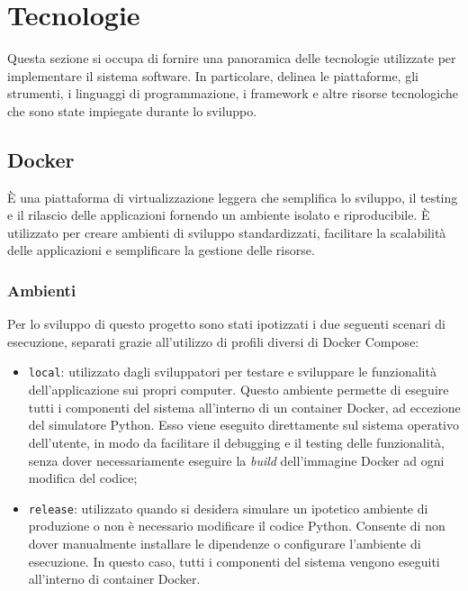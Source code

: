 \section{Tecnologie}
Questa sezione si occupa di fornire una panoramica delle tecnologie utilizzate per implementare il sistema software.
In particolare, delinea le piattaforme, gli strumenti, i linguaggi di programmazione, i framework e altre risorse tecnologiche che sono state impiegate durante lo sviluppo.

\subsection{Docker}
È una piattaforma di virtualizzazione leggera che semplifica lo sviluppo, il testing e il rilascio delle applicazioni fornendo un ambiente isolato e riproducibile.
È utilizzato per creare ambienti di sviluppo standardizzati, facilitare la scalabilità delle applicazioni e semplificare la gestione delle risorse.

\subsubsection{Ambienti}
Per lo sviluppo di questo progetto sono stati ipotizzati i due seguenti scenari di esecuzione, separati grazie all'utilizzo di profili diversi di Docker Compose:
\begin{itemize}
	\item \texttt{local}: utilizzato dagli sviluppatori per testare e sviluppare le funzionalità dell'applicazione sui propri computer.
	      Questo ambiente permette di eseguire tutti i componenti del sistema all'interno di un container Docker, ad eccezione del simulatore Python.
	      Esso viene eseguito direttamente sul sistema operativo dell'utente, in modo da facilitare il debugging e il testing delle funzionalità,
	      senza dover necessariamente eseguire la \textit{build} dell'immagine Docker ad ogni modifica del codice;
	\item \texttt{release}: utilizzato quando si desidera simulare un ipotetico ambiente di produzione o non è necessario modificare il codice Python. Consente di non dover manualmente
	      installare le dipendenze o configurare l'ambiente di esecuzione. In questo caso, tutti i componenti del sistema vengono eseguiti all'interno di container Docker.

\end{itemize}

